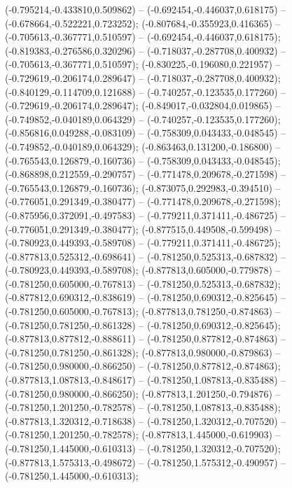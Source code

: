  (-0.795214,-0.433810,0.509862) -- (-0.692454,-0.446037,0.618175) -- (-0.678664,-0.522221,0.723252);
 (-0.807684,-0.355923,0.416365) -- (-0.705613,-0.367771,0.510597) -- (-0.692454,-0.446037,0.618175);
 (-0.819383,-0.276586,0.320296) -- (-0.718037,-0.287708,0.400932) -- (-0.705613,-0.367771,0.510597);
 (-0.830225,-0.196080,0.221957) -- (-0.729619,-0.206174,0.289647) -- (-0.718037,-0.287708,0.400932);
 (-0.840129,-0.114709,0.121688) -- (-0.740257,-0.123535,0.177260) -- (-0.729619,-0.206174,0.289647);
 (-0.849017,-0.032804,0.019865) -- (-0.749852,-0.040189,0.064329) -- (-0.740257,-0.123535,0.177260);
 (-0.856816,0.049288,-0.083109) -- (-0.758309,0.043433,-0.048545) -- (-0.749852,-0.040189,0.064329);
 (-0.863463,0.131200,-0.186800) -- (-0.765543,0.126879,-0.160736) -- (-0.758309,0.043433,-0.048545);
 (-0.868898,0.212559,-0.290757) -- (-0.771478,0.209678,-0.271598) -- (-0.765543,0.126879,-0.160736);
 (-0.873075,0.292983,-0.394510) -- (-0.776051,0.291349,-0.380477) -- (-0.771478,0.209678,-0.271598);
 (-0.875956,0.372091,-0.497583) -- (-0.779211,0.371411,-0.486725) -- (-0.776051,0.291349,-0.380477);
 (-0.877515,0.449508,-0.599498) -- (-0.780923,0.449393,-0.589708) -- (-0.779211,0.371411,-0.486725);
 (-0.877813,0.525312,-0.698641) -- (-0.781250,0.525313,-0.687832) -- (-0.780923,0.449393,-0.589708);
 (-0.877813,0.605000,-0.779878) -- (-0.781250,0.605000,-0.767813) -- (-0.781250,0.525313,-0.687832);
 (-0.877812,0.690312,-0.838619) -- (-0.781250,0.690312,-0.825645) -- (-0.781250,0.605000,-0.767813);
 (-0.877813,0.781250,-0.874863) -- (-0.781250,0.781250,-0.861328) -- (-0.781250,0.690312,-0.825645);
 (-0.877813,0.877812,-0.888611) -- (-0.781250,0.877812,-0.874863) -- (-0.781250,0.781250,-0.861328);
 (-0.877813,0.980000,-0.879863) -- (-0.781250,0.980000,-0.866250) -- (-0.781250,0.877812,-0.874863);
 (-0.877813,1.087813,-0.848617) -- (-0.781250,1.087813,-0.835488) -- (-0.781250,0.980000,-0.866250);
 (-0.877813,1.201250,-0.794876) -- (-0.781250,1.201250,-0.782578) -- (-0.781250,1.087813,-0.835488);
 (-0.877813,1.320312,-0.718638) -- (-0.781250,1.320312,-0.707520) -- (-0.781250,1.201250,-0.782578);
 (-0.877813,1.445000,-0.619903) -- (-0.781250,1.445000,-0.610313) -- (-0.781250,1.320312,-0.707520);
 (-0.877813,1.575313,-0.498672) -- (-0.781250,1.575312,-0.490957) -- (-0.781250,1.445000,-0.610313);
